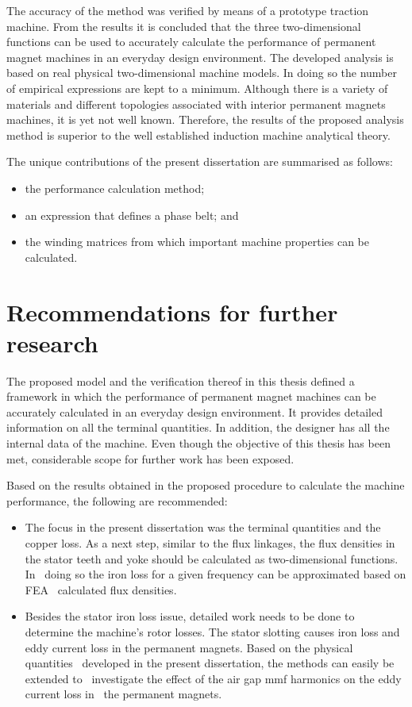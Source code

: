The accuracy of the method was verified by means of a prototype traction machine. From the results it is concluded that the three two-dimensional functions can be used to accurately calculate the performance of permanent magnet machines in an everyday design environment. The developed analysis is based on real physical two-dimensional machine models. In doing so the number of empirical expressions are kept to a minimum. Although there is a variety of materials and different topologies associated with interior permanent magnets machines, it is yet not well known. Therefore, the results of the proposed analysis method is superior to the well established induction machine analytical theory. 

The unique contributions of the present dissertation are summarised as follows:
\begin{itemize}
	\item the performance calculation method;
	\item an expression that defines a phase belt; and
	\item the winding matrices from which important machine properties can be calculated.
\end{itemize}
    

\section{Recommendations for further research}
The proposed model and the verification thereof in this thesis defined a framework in which the performance of permanent magnet machines can be accurately calculated in an everyday design environment. It provides detailed information on all the terminal quantities. In addition, the designer has all the internal data of the machine. Even though the objective of this thesis has been met, considerable scope for further work has been exposed. 

Based on the results obtained in the proposed procedure to calculate the machine performance, the following are recommended:
\begin{itemize}
	\item The focus in the present dissertation was the terminal quantities and the~%
	copper loss. As a next step, similar to the flux linkages, the flux densities in~%
	the stator teeth and yoke should be calculated as two-dimensional functions. In~%
	doing so the iron loss for a given frequency can be approximated based on FEA~%
	calculated flux densities.
	\item Besides the stator iron loss issue, detailed work needs to be done to~%
	determine the machine's rotor losses. The stator slotting causes iron loss and~%
	eddy current loss in the permanent magnets. Based on the physical quantities~%
	developed in the present dissertation, the methods can easily be extended to~%
	investigate the effect of the air gap mmf harmonics on the eddy current loss in~%
	the permanent magnets. 
\end{itemize}

\endinput